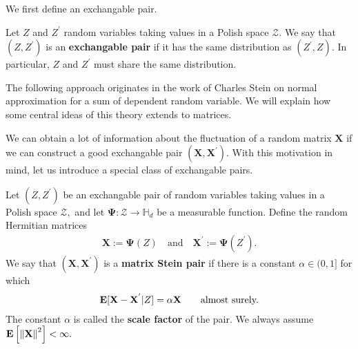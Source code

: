 We first define an exchangable pair.
\begin{definition}
  Let 
  $Z$ and $Z^{'}$
  random variables taking values
  in a Polish space $\mathcal{Z}.$
  We say that
  $
  (
    Z
    ,
    Z^{'}
  )
  $
  is an \textbf{exchangable pair}
  if it has the same distribution as 
  $
  (
  Z^{'}
    ,
    Z
  )
  .
  $
  In particular, 
  $Z$ and $Z^{'}$
  must share the same distribution.
\end{definition}

The following approach originates in the work of Charles Stein \cite{Stein1972} 
on normal approximation for a sum of dependent random variable.
We will explain how some central ideas of this theory extends to matrices.

We can obtain a lot of information about the fluctuation of a random matrix
$\mathbf{X}$
if we can construct a good exchangable pair 
$
(
  \mathbf{X}
  ,
  \mathbf{X}^{'}
)
.
$
With this motivation in mind, let us introduce a special class of exchangable pairs.
\begin{definition}
  Let
  $
  (
    Z
    ,
    Z^{'}
  )
  $
  be an exchangable pair of random variables taking values
  in a Polish space $\mathcal{Z},$
  and let 
  $
    \mathbf{\Psi}
    : 
    \mathcal{Z}
    \to 
  \mathbb{H}_d
  $
  be a measurable function.
  Define the random Hermitian matrices
  \begin{gather}
    \mathbf{X}
    :=
    \mathbf{\Psi}
    (Z)
    \quad
    \text{and}
    \quad
    \mathbf{X}^{'}
    :=
    \mathbf{\Psi}
    (Z^{'})
    .
  \end{gather}
  We say that 
  $
  (
    \mathbf{X}
    ,
    \mathbf{X}^{'}
  )
  $
  is a \textbf{matrix Stein pair}
  if there is a constant 
  $\alpha\in (0,1]$
  for which
  \begin{gather}
    \mathbf{E}[
    \mathbf{X}
    -
    \mathbf{X}^{'}
    \vert
    Z
    ]
    =
    \alpha 
    \mathbf{X}
    \qquad
    \text{almost surely.}
  \end{gather}
  The constant 
  $\alpha$
  is called the \textbf{scale factor} of the pair.
  We always assume 
  $
    \mathbf{E}
    \left[ 
      \left\lVert\mathbf{X}\right\rVert^2
    \right]
    <
    \infty
    .
  $
\end{definition}

